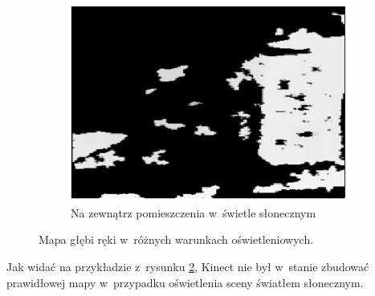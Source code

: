 \begin{savenotes}
\begin{figure}[!htb]
\begin{subfigure}[b]{0.32\textwidth}
			\includegraphics[width=\textwidth]{images/kinecOutdoorFull.png}		
			\caption{Na zewnątrz pomieszczenia w~świetle słonecznym}
			\label{fig:characteristics:kinect:depthMapC}
		\end{subfigure}
																																																							
		\caption[Mapa głębi ręki w~różnych warunkach oświetleniowych]{Mapa głębi ręki w~różnych warunkach oświetleniowych\cite{Suarez2012}.}
		\label{fig:characteristics:kinect:depthMap}
	\end{figure}
\end{savenotes}
																																	
																																			
Jak widać na przykładzie z~rysunku \ref{fig:characteristics:kinect:depthMap}, Kinect nie był w~stanie zbudować prawidłowej mapy w~przypadku oświetlenia sceny światłem słonecznym.

